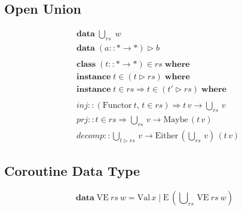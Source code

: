 \documentclass{article}
\newcommand{\hdata}{\mathbf{data}}
\newcommand{\hclass}{\mathbf{class}}
\newcommand{\hinstance}{\mathbf{instance}}
\newcommand{\hwhere}{\mathbf{where}}
\newcommand{\hFunctor}{\text{Functor}}
\newcommand{\hMaybe}{\text{Maybe}}
\newcommand{\hEither}{\text{Either}}
\newcommand{\ty}{:\!:}
\newcommand{\C}[1]{\text{#1}}
\newcommand{\Cbar}{\;\mathbf{|}\;}
\newcommand{\U}{\bigcup\nolimits}
\begin{document}
\subsection*{Open Union}
\[\begin{aligned}
&\hdata\; \U_{rs}\; w \\
&\hdata\; (a \ty * \to *) \rhd b \\
\\
&\hclass\; (t \ty * \to *) \in rs\; \hwhere \\
&\hinstance\; t\in (t\rhd rs)\; \hwhere \\
&\hinstance\; t\in rs \Rightarrow t \in (t' \rhd rs)\; \hwhere \\
\\
&inj \ty (\hFunctor\: t,\, t \in rs) \Rightarrow t\, v \to \U_{rs}\, v \\
&prj \ty t \in rs \Rightarrow \U_{rs}\,v \to \hMaybe\, (t\, v) \\
&decomp \ty \U_{t \rhd rs}\, v \to \hEither\, \left(\U_{rs}\, v\right)\, (t\, v)
\end{aligned}\]
\subsection*{Coroutine Data Type}
\[ \hdata\; \C{VE}\: rs\: w = \C{Val}\, x \Cbar \C{E}\, \left(\U_{rs}\, \C{VE}\: rs\: w\right) \]
\end{document}

